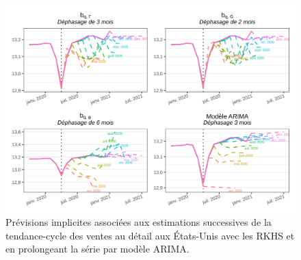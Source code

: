 \documentclass[
  12pt,
  french,
  12pt,a4paper]{article}
\newcommand\1{\mathds{1}}
\begin{document}
\begin{figure}

{\centering \includegraphics[width=0.9\linewidth]{img/nber/retailx_rkhs_arima_implicit_forecast} 

}

\caption[Prévisions implicites associées aux estimations successives de la tendance-cycle des ventes au détail aux États-Unis avec les RKHS et en prolongeant la série par modèle ARIMA]{Prévisions implicites associées aux estimations successives de la tendance-cycle des ventes au détail aux États-Unis avec les RKHS et en prolongeant la série par modèle ARIMA.}\label{fig:retailxiprkhs}

\footnotesize
\normalsize\end{figure}
\end{document}
